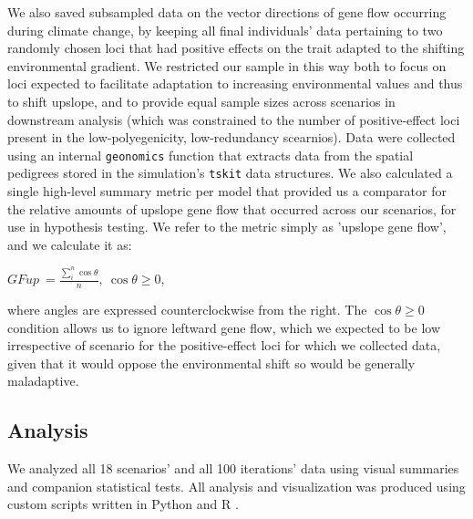 \documentclass[9pt,twocolumn,twoside,lineno]{pnas-new}
\begin{document}
{We also saved subsampled data on the vector directions
of gene flow occurring during climate change, by keeping all final individuals'
data pertaining to two randomly chosen loci that had positive
effects on the trait adapted to the shifting environmental gradient.
We restricted our sample in this way both to focus on loci expected to facilitate 
adaptation to increasing environmental values and thus to shift upslope, and to 
provide equal sample sizes across scenarios in downstream analysis (which was 
constrained to the number of positive-effect loci present in
the low-polyegenicity, low-redundancy scearnios). 
Data were collected using an internal \texttt{geonomics} function
that extracts data from the spatial pedigrees stored in the
simulation's \texttt{tskit} \cite{kelleher} data structures.
We also calculated a single high-level summary metric per model
that provided us a comparator for the relative amounts of
upslope gene flow that occurred across our scenarios,
for use in hypothesis testing.
We refer to the metric simply as 'upslope gene flow',
and we calculate it as:

$GFup\ = \frac{\sum\limits_{i}^{n}\cos\theta}{n},\ \cos\theta\geq0$,

where angles are expressed counterclockwise from the right.
The $\cos\theta\geq0$ condition allows us to ignore leftward gene flow,
which we expected to be low irrespective of scenario for the positive-effect loci
for which we collected data,
given that it would oppose the environmental shift so would be generally maladaptive.


\subsection*{Analysis}

We analyzed all 18 scenarios' and all 100 iterations' data
using visual summaries and companion statistical tests.
All analysis and visualization was produced using custom scripts written in 
Python and R \cite{r_core_team}.

}
\end{document}
